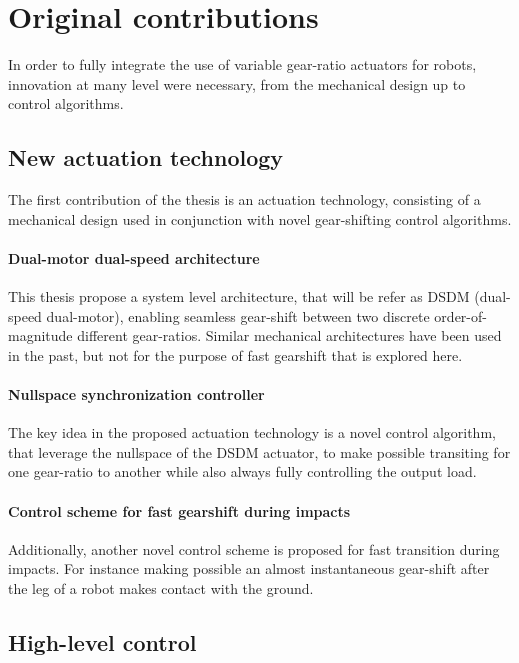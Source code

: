 \section{Original contributions}
\label{sec:contribution}

In order to fully integrate the use of variable gear-ratio actuators for robots, innovation at many level were necessary, from the mechanical design up to control algorithms. 

\subsection{New actuation technology}

The first contribution of the thesis is an actuation technology, consisting of a mechanical design used in conjunction with novel gear-shifting control algorithms. 

\paragraph{Dual-motor dual-speed architecture}

This thesis propose a system level architecture, that will be refer as DSDM (dual-speed dual-motor), enabling seamless gear-shift between two discrete order-of-magnitude different gear-ratios. Similar mechanical architectures have been used in the past, but not for the purpose of fast gearshift that is explored here.

\paragraph{Nullspace synchronization controller}

The key idea in the proposed actuation technology is a novel control algorithm, that leverage the nullspace of the DSDM actuator, to make possible transiting for one gear-ratio to another while also always fully controlling the output load. 

\paragraph{Control scheme for fast gearshift during impacts}

Additionally, another novel control scheme is proposed for fast transition during impacts. For instance making possible an almost instantaneous gear-shift after the leg of a robot makes contact with the ground.


\subsection{High-level control}

